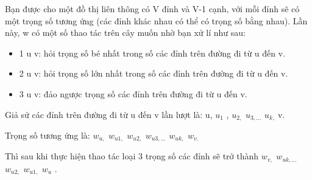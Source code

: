 Bạn được cho một đồ thị liên thông có V đỉnh và V-1 cạnh, với mỗi đỉnh sẽ có một trọng số tương ứng (các đỉnh khác nhau có thể có trọng số bằng nhau). Lần này, w có một số thao tác trên cây muốn nhờ bạn xử lí như sau:
\begin{itemize}
	\item 1 u v: hỏi trọng số bé nhất trong số các đỉnh trên đường đi từ u đến v.
	\item 2 u v: hỏi trọng số lớn nhất trong số các đỉnh trên đường đi từ u đến v.
	\item 3 u v: đảo ngược trọng số các đỉnh trên đường đi từ u đến v.
\end{itemize}

Giả sử các đỉnh trên đường đi từ u đến v lần lượt là: u, $u_{1}$ , $u_{2,}$ $u_{3,...}$ $u_{k}$$_ , $ v.

Trọng số tương ứng là: $w_{u,}$ $w_{u1,}$ $w_{u2,}$ $w_{u3,...}$ $w_{uk,}$ $w_{v.}$

Thì sau khi thực hiện thao tác loại 3 trọng số các đỉnh sẽ trở thành $w_{v,}$ $w_{uk,...}$ $w_{u2,}$ $w_{u1,}$ $w_{u}$ .